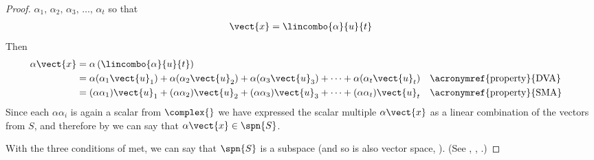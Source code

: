 \begin{proof}
$\alpha_1,\,\alpha_2,\,\alpha_3,\,\ldots,\,\alpha_t$ so that
%
\begin{align*}
\vect{x}&=\lincombo{\alpha}{u}{t}\\
\end{align*}
%
Then
%
\begin{align*}
\alpha\vect{x}&=\alpha\left(\lincombo{\alpha}{u}{t}\right)\\
&=\alpha(\alpha_1\vect{u}_1)+\alpha(\alpha_2\vect{u}_2)+\alpha(\alpha_3\vect{u}_3)+\cdots+\alpha(\alpha_t\vect{u}_t)&&\text{\acronymref{property}{DVA}}\\
&=(\alpha\alpha_1)\vect{u}_1+(\alpha\alpha_2)\vect{u}_2+(\alpha\alpha_3)\vect{u}_3+\cdots+(\alpha\alpha_t)\vect{u}_t&&\text{\acronymref{property}{SMA}}\\
\end{align*}
%
Since each $\alpha\alpha_i$ is again a scalar from $\complex{\null}$ we have expressed the scalar multiple $\alpha\vect{x}$ as a linear combination of the vectors from $S$, and therefore by  we can say that $\alpha\vect{x}\in\spn{S}$.\par
%
With the three conditions of  met, we can say that $\spn{S}$ is a subspace (and so is also vector space, ).
(See , , .)
\end{proof}
%
